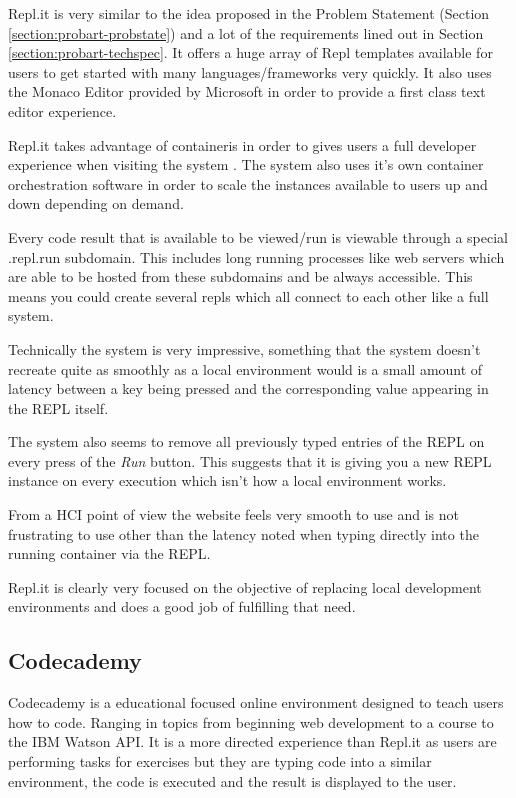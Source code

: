 Repl.it is very similar to the idea proposed in the Problem Statement (Section \ref{section:probart-probstate}) and a lot of the requirements lined out in Section \ref{section:probart-techspec}. It offers a huge array of Repl templates available for users to get started with many languages/frameworks very quickly. It also uses the Monaco Editor provided by Microsoft in order to provide a first class text editor experience.

Repl.it takes advantage of containeris in order to gives users a full developer experience when visiting the system \cite{replit-containers}. The system also uses it's own container orchestration software in order to scale the instances available to users up and down depending on demand.

Every code result that is available to be viewed/run is viewable through a special .repl.run subdomain. This includes long running processes like web servers which are able to be hosted from these subdomains and be always accessible. This means you could create several repls which all connect to each other like a full system.

Technically the system is very impressive, something that the system doesn't recreate quite as smoothly as a local environment would is a small amount of latency between a key being pressed and the corresponding value appearing in the REPL itself.

The system also seems to remove all previously typed entries of the REPL on every press of the \textit{Run} button. This suggests that it is giving you a new REPL instance on every execution which isn't how a local environment works.

From a HCI point of view the website feels very smooth to use and is not frustrating to use other than the latency noted when typing directly into the running container via the REPL.

Repl.it is clearly very focused on the objective of replacing local development environments and does a good job of fulfilling that need.

\subsection{Codecademy}
Codecademy is a educational focused online environment designed to teach users how to code. Ranging in topics from beginning web development to a course to the IBM Watson API. It is a more directed experience than Repl.it as users are performing tasks for exercises but they are typing code into a similar environment, the code is executed and the result is displayed to the user.

